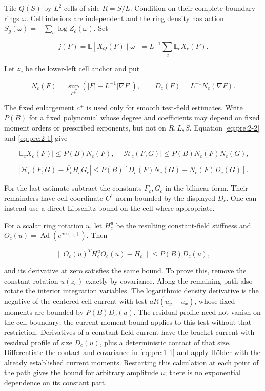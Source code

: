 Tile \(Q(S)\) by \(L^2\) cells of side \(R=S/L\). Condition on their complete boundary rings \(\omega\). Cell interiors are independent and the ring density has action
\(S_g(\omega)=-\sum_c\log Z_c(\omega)\). Set

\[
j(F)=\mathbb E[X_Q(F)\mid\omega]
=L^{-1}\sum_c\mathbb E_cX_c(F).
\]

Let \(z_c\) be the lower-left cell anchor and put

\[
N_c(F)=\sup_{c^+}(|F|+L^{-1}|\nabla F|),\qquad
D_c(F)=L^{-1}N_c(\nabla F).
\]

The fixed enlargement \(c^+\) is used only for smooth test-field estimates. Write \(P(B)\) for a fixed polynomial whose degree and coefficients may depend on fixed moment orders or prescribed exponents, but not on \(R,L,S\). Equation \eqref{eq:pre:2-2} and \eqref{eq:pre:2-1} give

\begin{equation}
|\mathbb E_cX_c(F)|\leq P(B)N_c(F),\quad
|\mathcal H_c(F,G)|\leq P(B)N_c(F)N_c(G),
\label{eq:pre:3-1}
\end{equation}

\begin{equation}
|\mathcal H_c(F,G)-\overline{F_c}H_cG_c|
\leq P(B)[D_c(F)N_c(G)+N_c(F)D_c(G)].
\label{eq:pre:3-2}
\end{equation}

For the last estimate subtract the constants \(F_c,G_c\) in the bilinear form. Their remainders have cell-coordinate \(C^1\) norm bounded by the displayed \(D_c\). One can instead use a direct Lipschitz bound on the cell where appropriate.

For a scalar ring rotation \(u\), let \(H_c^u\) be the resulting constant-field stiffness and \(O_c(u)=\operatorname{Ad}(e^{au(z_c)})\). Then

\begin{equation}
\|O_c(u)^TH_c^uO_c(u)-H_c\|\leq P(B)D_c(u),
\label{eq:pre:3-3}
\end{equation}

and its derivative at zero satisfies the same bound. To prove this, remove the constant rotation \(u(z_c)\) exactly by covariance. Along the remaining path also rotate the interior integration variables. The logarithmic density derivative is the negative of the centered cell current with test \(aR(u_y-u_x)\), whose fixed moments are bounded by \(P(B)D_c(u)\). The residual profile need not vanish on the cell boundary; the current-moment bound applies to this test without that restriction. Derivatives of a constant-field current have the bracket current with residual profile of size \(D_c(u)\), plus a deterministic contact of that size. Differentiate the contact and covariance in \eqref{eq:pre:1-1} and apply H\"older with the already established current moments. Restarting this calculation at each point of the path gives the bound for arbitrary amplitude \(u\); there is no exponential dependence on its constant part.

